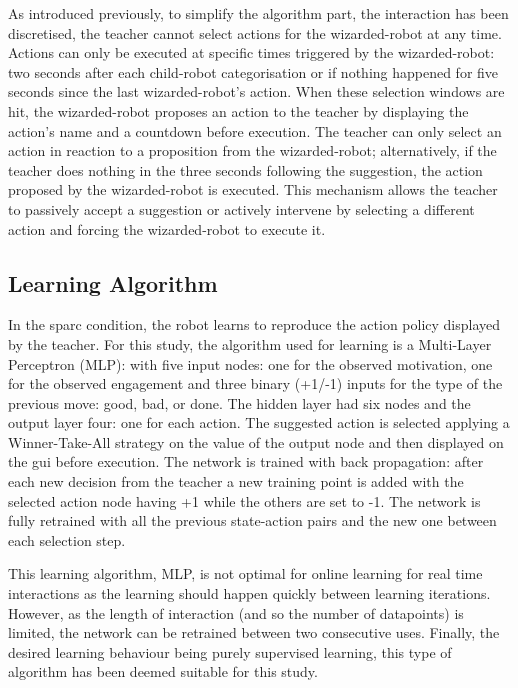 As introduced previously, to simplify the algorithm part, the interaction has been discretised, the teacher cannot select actions for the wizarded-robot at any time. Actions can only be executed at specific times triggered by the wizarded-robot: two seconds after each child-robot categorisation or if nothing happened for five seconds since the last wizarded-robot's action. When these selection windows are hit, the wizarded-robot proposes an action to the teacher by displaying the action's name and a countdown before execution. The teacher can only select an action in reaction to a proposition from the wizarded-robot; alternatively, if the teacher does nothing in the three seconds following the suggestion, the action proposed by the wizarded-robot is executed. This mechanism allows the teacher to passively accept a suggestion or actively intervene by selecting a different action and forcing the wizarded-robot to execute it.

\subsection{Learning Algorithm}

In the \gls{sparc} condition, the robot learns to reproduce the action policy displayed by the teacher. For this study, the algorithm used for learning is a Multi-Layer Perceptron (MLP): with five input nodes: one for the observed motivation, one for the observed engagement and three binary (+1/-1) inputs for the type of the previous move: good, bad, or done. The hidden layer had six nodes and the output layer four: one for each action. The suggested action is selected applying a Winner-Take-All strategy on the value of the output node and then displayed on the \gls{gui} before execution. The network is trained with back propagation: after each new decision from the teacher a new training point is added with the selected action node having +1 while the others are set to -1. The network is fully retrained with all the previous state-action pairs and the new one between each selection step. 

This learning algorithm, MLP, is not optimal for online learning for real time interactions as the learning should happen quickly between learning iterations. However, as the length of interaction (and so the number of datapoints) is limited, the network can be retrained between two consecutive uses. Finally, the desired learning behaviour being purely supervised learning, this type of algorithm has been deemed suitable for this study.

